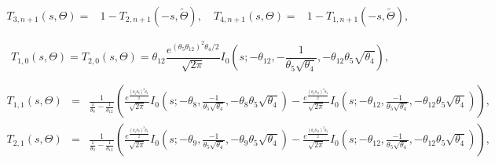 \documentclass[11pt]{article}
\numberwithin{equation}{section}
\numberwithin{theorem}{section}
\begin{document}
\begin{eqnarray*}
T_{3,n+1}\left(s,\Theta\right) = & 1-T_{2,n+1}\left(-s,\tilde{\Theta}\right),\quad 
T_{4,n+1}\left(s,\Theta\right) = & 1-T_{1,n+1}\left(-s,\tilde{\Theta}\right),
\end{eqnarray*}
 
\[
T_{1,0}\left(s,\Theta\right)= T_{2,0}\left(s,\Theta\right)=\theta_{12}\frac{e^{\left(\theta_5\theta_{12}\right)^{2}\theta_4/2}}{\sqrt{2\pi}}I_{0}\left(s;-\theta_{12},-\frac{1}{\theta_5\sqrt{\theta_4}},-\theta_{12}\theta_5\sqrt{\theta_4}\right),
\]
 
\begin{eqnarray*}
T_{1,1}\left(s,\Theta\right) & = & \frac{1}{\frac{1}{\theta_{8}}-\frac{1}{\theta_{12}}}\left(\frac{e^{\frac{\left(\theta_5\theta_{8}\right)^{2}\theta_4}{2}}}{\sqrt{2\pi}}I_{0}\left(s;-\theta_{8},\frac{-1}{\theta_5\sqrt{\theta_4}},-\theta_{8}\theta_5\sqrt{\theta_4}\right)-\frac{e^{\frac{\left(\theta_5\theta_{12}\right)^{2}\theta_4}{2}}}{\sqrt{2\pi}}I_{0}\left(s;-\theta_{12},\frac{-1}{\theta_5\sqrt{\theta_4}},-\theta_{12}\theta_5\sqrt{\theta_4}\right)\right),\\
T_{2,1}\left(s,\Theta\right) & = & \frac{1}{\frac{1}{\theta_{9}}-\frac{1}{\theta_{12}}}\left(\frac{e^{\frac{\left(\theta_5\theta_{9}\right)^{2}\theta_4}{2}}}{\sqrt{2\pi}}I_{0}\left(s;-\theta_{9},\frac{-1}{\theta_5\sqrt{\theta_4}},-\theta_{9}\theta_5\sqrt{\theta_4}\right)-\frac{e^{\frac{\left(\theta_5\theta_{12}\right)^{2}\theta_4}{2}}}{\sqrt{2\pi}}I_{0}\left(s;-\theta_{12},\frac{-1}{\theta_5\sqrt{\theta_4}},-\theta_{12}\theta_5\sqrt{\theta_4}\right)\right),
\end{eqnarray*}
 
\end{document}
